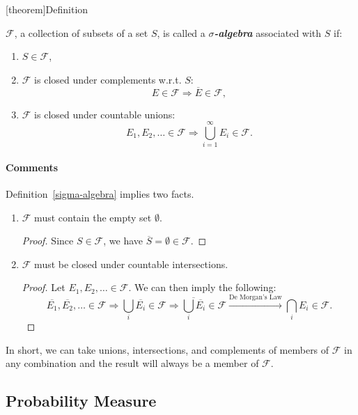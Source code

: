 \documentclass[12pt]{report}
\theoremstyle{definition}
\begin{document}
[theorem]{Definition}
\begin{sigma algebra}\label{sigma-algebra}
    $\mathcal{F}$, a collection of subsets of a set $S$,
    is called a \textbf{\emph{$\sigma$-algebra}} associated with
    $S$ if:
    \begin{enumerate}[label = (\alph*)]
        \item $S\in\mathcal{F}$,
        \item $\mathcal{F}$ is closed under complements w.r.t. $S$:
            \[
                E\in\mathcal{F} \Longrightarrow \overline{E}\in\mathcal{F},
            \]
        \item $\mathcal{F}$ is closed under countable unions:
            \[
                E_1,E_2,\ldots\in\mathcal{F}\Longrightarrow
                \bigcup_{i=1}^{\infty}E_i\in\mathcal{F}.
            \]
    \end{enumerate} 
\end{sigma algebra}

\paragraph{Comments}
Definition~\ref{sigma-algebra} implies two facts.
\begin{enumerate}
    \item $\mathcal{F}$ must contain the empty set $\emptyset$.
        \begin{proof}
            Since $S\in\mathcal{F}$, we have
            $\overline{S}=\emptyset\in\mathcal{F}$.
        \end{proof} 
    \item $\mathcal{F}$ must be closed under countable intersections.
        \begin{proof}
            Let $E_1,E_2,\ldots\in\mathcal{F}$. We can then imply the following:
            \[
                \overline{E_1},\overline{E_2},\ldots\in\mathcal{F}
                \Rightarrow \bigcup_i \overline{E_i}\in\mathcal{F}
                \Rightarrow \overline{\bigcup_i \overline{E_i}}\in\mathcal{F}
                \xrightarrow{\text{De Morgan's Law}}\bigcap_iE_i\in\mathcal{F}.
            \]
        \end{proof} 
\end{enumerate} 
In short, we can take unions, intersections, and complements of members of
$\mathcal{F}$ in any combination and the result will always be a member of
$\mathcal{F}$.

\subsection{Probability Measure}
\end{document}
